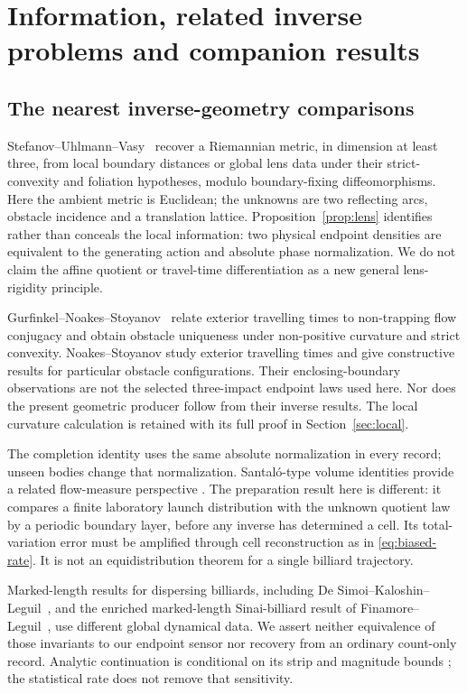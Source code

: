 \section{Information, related inverse problems and companion results}
\label{sec:comparison}
\subsection{The nearest inverse-geometry comparisons}
Stefanov--Uhlmann--Vasy~\cite[Theorems 1.1 and 1.3]{SUV} recover a
Riemannian metric, in dimension at least three, from local boundary
distances or global lens data under their strict-convexity and foliation
hypotheses, modulo boundary-fixing diffeomorphisms. Here the ambient metric
is Euclidean; the unknowns are two reflecting arcs, obstacle incidence and
a translation lattice. Proposition~\ref{prop:lens} identifies rather than
conceals the local information: two physical endpoint densities are
equivalent to the generating action and absolute phase normalization.
We do not claim the affine quotient or travel-time differentiation as a
new general lens-rigidity principle.

Gurfinkel--Noakes--Stoyanov~\cite[Theorems 1 and 2]{GNS} relate exterior
travelling times to non-trapping flow conjugacy and obtain obstacle
uniqueness under non-positive curvature and strict convexity. Noakes--Stoyanov
\cite{NS} study exterior travelling times and give constructive results
for particular obstacle configurations. Their enclosing-boundary observations
are not the selected three-impact endpoint laws used here. Nor does the
present geometric producer follow from their inverse results. The local
curvature calculation is retained with its full proof in Section~\ref{sec:local}.

The completion identity uses the same absolute normalization in every
record; unseen bodies change that normalization. Santal\'o-type volume
identities provide a related flow-measure perspective \cite{Santalo}.
The preparation result here is different: it compares a finite laboratory
launch distribution with the unknown quotient law by a periodic boundary
layer, before any inverse has determined a cell. Its total-variation
error must be amplified through cell reconstruction as in
\eqref{eq:biased-rate}. It is not an equidistribution theorem for a
single billiard trajectory.

Marked-length results for dispersing billiards, including
De Simoi--Kaloshin--Leguil~\cite{DSKL}, and the enriched marked-length
Sinai-billiard result of Finamore--Leguil~\cite{FL}, use different global
dynamical data. We assert neither equivalence of those invariants to our
endpoint sensor nor recovery from an ordinary count-only record. Analytic
continuation is conditional on its strip and magnitude bounds
\cite{Trefethen}; the statistical rate does not remove that sensitivity.

